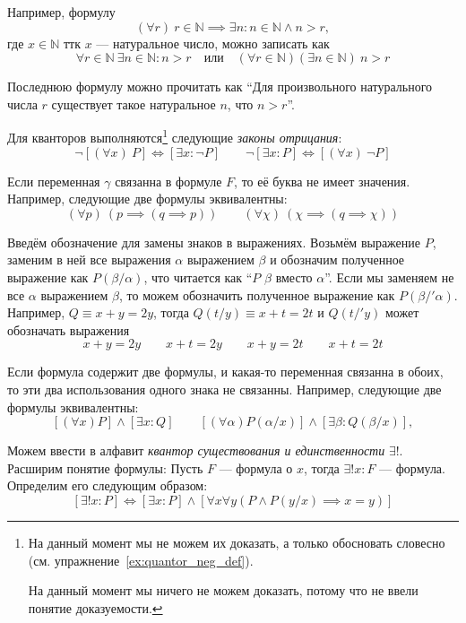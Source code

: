Например, формулу
\newcommand\N{\mathbb N}
\[
	(\forall r)~r\in\N\implies \exists n:n\in\N\land n>r,
\]
где $x\in\N$ ттк $x$ --- натуральное число, можно записать как
\[
	\forall r\in\N~\exists n\in\N:n>r\quad\text{или}\quad
	(\forall r\in\N)(\exists n\in\N)~n>r
\]

Последнюю формулу можно прочитать как ``Для произвольного натурального числа
$r$ существует такое натуральное $n$, что $n>r$''.

Для кванторов выполняются\footnote{
	На данный момент мы не можем их доказать, а только
	обосновать словесно (см. упражнение~\ref{ex:quantor_neg_def}).

	На данный момент мы ничего не можем доказать, потому что не ввели
	понятие доказуемости.
} следующие {\it законы отрицания}:
\[
	\lnot[(\forall x)~P]\iff[\exists x:\lnot P]\qquad
	\lnot[\exists x:P]\iff[(\forall x)~\lnot P]
\]

Если переменная $\gamma$ связанна в формуле $F$, то её буква не имеет значения.
Например, следующие две формулы эквивалентны:
\[
	(\forall p)~(p\implies (q\implies p))\qquad
	(\forall \chi)~(\chi\implies (q\implies\chi))
\]

Введём обозначение для замены знаков в выражениях.
Возьмём выражение $P$, заменим в ней все выражения $\alpha$ выражением $\beta$ и
обозначим полученное выражение как $P(\beta/\alpha)$, что читается как
``$P$ $\beta$ вместо $\alpha$''.
Если мы заменяем не все $\alpha$ выражением $\beta$, то можем обозначить полученное
выражение как $P(\beta/'\alpha)$.
Например, $Q\equiv x+y=2y$, тогда $Q(t/y)\equiv x+t=2t$ и $Q(t/'y)$ может
обозначать выражения
\[
	x+y=2y\qquad x+t=2y\qquad x+y=2t\qquad x+t=2t
\]

Если формула содержит две формулы, и какая-то переменная
связанна в обоих, то эти два использования
одного знака не связанны.
Например, следующие две формулы эквивалентны:
\[
	[(\forall x)P]\land[\exists x:Q]\qquad
	[(\forall \alpha)P(\alpha/x)]\land[\exists \beta:Q(\beta/x)],
\]

\label{page:exists_only}
Можем ввести в алфавит {\it квантор существования и единственности} $\exists!$.
Расширим понятие формулы: Пусть $F$ --- формула о $x$,
тогда ${\exists! x:F}$ --- формула. Определим его следующим образом:
\[
	[\exists! x:P]\iff[\exists x:P]\land
	[\forall x\forall y(P\land P(y/x)\implies x=y)]
\]


